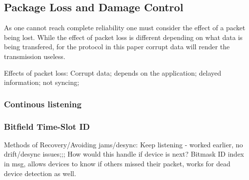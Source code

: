 \subsection{Package Loss and Damage Control}
As one cannot reach complete reliability one must consider the effect of a packet being lost.
While the effect of packet loss is different depending on what data is being transfered, for the protocol in this paper corrupt data will render the transmission useless.


Effects of packet loss:
Corrupt data; depends on the application; delayed information; not syncing;
\subsubsection*{Continous listening}
\subsubsection*{Bitfield Time-Slot ID}

Methods of Recovery/Avoiding jams/desync:
Keep listening - worked earlier, no drift/desync issues;;; How would this handle if device is next?
Bitmask ID index in msg, allows devices to know if others missed their packet, works for dead device detection as well.
